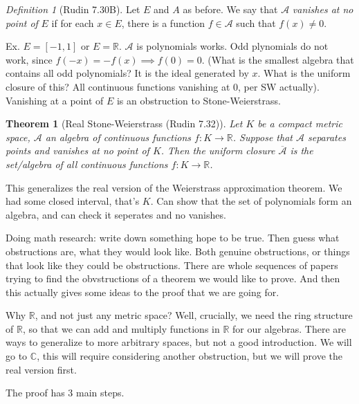 \documentclass{article}
\theoremstyle{plain}
\newtheorem{theorem}{Theorem}
\theoremstyle{remark}
\newtheorem{definition}{Definition}
\newcommand{\R}{{\mathbb R}}
\newcommand{\C}{{\mathbb C}}
\begin{document}
\begin{definition}[Rudin 7.30B]
	Let $E$ and $A$ as before.
	We say that $\mathcal{A}$ \emph{vanishes at no point of} $E$
	if for each $x \in E$, there is a function $f \in \mathcal{A}$ such that $f(x) \neq 0$.
\end{definition}
Ex. $E = [-1,1]$ or $E = \R$.
$\mathcal{A}$ is polynomials works.
Odd plynomials do not work, since $f(-x) = -f(x) \implies f(0) = 0$.
(What is the smallest algebra that contains all odd polynomials?
It is the ideal generated by $x$.
What is the uniform closure of this? All continuous functions vanishing at 0, per SW actually).
Vanishing at a point of $E$ is an obstruction to Stone-Weierstrass.

\begin{theorem}[Real Stone-Weierstrass (Rudin 7.32)]
	Let $K$ be a compact metric space,
	$\mathcal{A}$ an algebra of continuous functions $f\colon K \to \R$.
	Suppose that $\mathcal{A}$ separates points and vanishes at no point of $K$.
	Then the uniform closure $\overline{\mathcal{A}}$ is the set/algebra
	of all continuous functions $f \colon K \to \R$.
\end{theorem}
This generalizes the real version of the Weierstrass approximation theorem.
We had some closed interval, that's $K$.
Can show that the set of polynomials form an algebra,
and can check it seperates and no vanishes.

Doing math research: write down something hope to be true.
Then guess what obstructions are, what they would look like.
Both genuine obstructions, or things that look like they could be obstructions.
There are whole sequences of papers trying to find the obvstructions
of a theorem we would like to prove.
And then this actually gives some ideas to the proof that we are going for.

Why $\R$, and not just any metric space?
Well, crucially, we need the ring structure of $\R$,
so that we can add and multiply functions in $\R$ for our algebras.
There are ways to generalize to more arbitrary spaces, but not a good introduction.
We will go to $\C$, this will require considering another obstruction,
but we will prove the real version first.

The proof has $3$ main steps.
\end{document}
